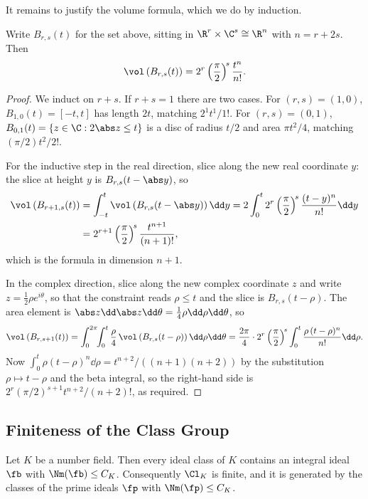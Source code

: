It remains to justify the volume formula, which we do by induction.

\begin{lemma}\label{lem:volB}
	Write $B_{r,s}(t)$ for the set above, sitting in $\R^r\times\C^s \cong \R^{n}$ with $n = r+2s$. Then
	$$\vol\left(B_{r,s}(t)\right) = 2^r\left(\frac{\pi}{2}\right)^{\!s}\frac{t^n}{n!}.$$
\end{lemma}

\begin{proof}
	We induct on $r+s$. If $r+s = 1$ there are two cases. For $(r,s) = (1,0)$, $B_{1,0}(t) = [-t,t]$ has length $2t$, matching $2^1t^1/1!$. For $(r,s) = (0,1)$, $B_{0,1}(t) = \{z \in \C : 2\abs z \le t\}$ is a disc of radius $t/2$ and area $\pi t^2/4$, matching $(\pi/2)t^2/2!$.

	For the inductive step in the real direction, slice along the new real coordinate $y$: the slice at height $y$ is $B_{r,s}(t-\abs y)$, so
	\begin{align*}
		\vol\left(B_{r+1,s}(t)\right) &= \int_{-t}^{t}\vol\left(B_{r,s}(t-\abs y)\right)\dd y = 2\int_0^t 2^r\left(\frac\pi2\right)^{\!s}\frac{(t-y)^{n}}{n!}\dd y\\
		&= 2^{r+1}\left(\frac\pi2\right)^{\!s}\frac{t^{n+1}}{(n+1)!},
	\end{align*}
	which is the formula in dimension $n+1$.

	In the complex direction, slice along the new complex coordinate $z$ and write $z = \tfrac12\rho e^{i\theta}$, so that the constraint reads $\rho \le t$ and the slice is $B_{r,s}(t-\rho)$. The area element is $\abs z \dd\abs z\dd\theta = \tfrac14\rho\dd\rho\dd\theta$, so
	$$\vol\left(B_{r,s+1}(t)\right) = \int_0^{2\pi}\!\!\int_0^t \frac{\rho}{4}\,\vol\left(B_{r,s}(t-\rho)\right)\dd\rho\dd\theta = \frac{2\pi}{4}\cdot2^r\left(\frac\pi2\right)^{\!s}\int_0^t\frac{\rho\,(t-\rho)^n}{n!}\dd\rho.$$
	Now $\int_0^t\rho(t-\rho)^n\dd\rho = t^{n+2}/((n+1)(n+2))$ by the substitution $\rho \mapsto t-\rho$ and the beta integral, so the right-hand side is $2^r(\pi/2)^{s+1}t^{n+2}/(n+2)!$, as required.
\end{proof}

\subsection{Finiteness of the Class Group}

\begin{theorem}\label{thm:finiteclass}
	Let $K$ be a number field. Then every ideal class of $K$ contains an integral ideal $\fb$ with $\Nm(\fb) \le C_K$. Consequently $\Cl_K$ is finite, and it is generated by the classes of the prime ideals $\fp$ with $\Nm(\fp) \le C_K$.
\end{theorem}

